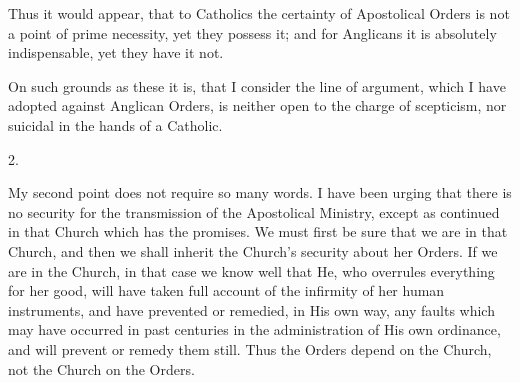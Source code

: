 Thus it would appear, that to Catholics the certainty of
Apostolical Orders is not a point of prime necessity, yet they possess
it; and for Anglicans it is absolutely indispensable, yet they have it
not.

On such grounds as these it is, that I consider the line of
argument, which I have adopted against Anglican Orders, is neither
open to the charge of scepticism, nor suicidal in the hands of a
Catholic.

2.

My second point does not require so many words. I have been urging
that there is no security for the transmission of the Apostolical
Ministry, except as continued in that Church which has the promises.
We must first be sure that we are in that Church, and then we
shall inherit the Church's security about her Orders. If we are in the
Church, in that case we know well that He, who overrules everything
for her good, will have taken full account of the infirmity of her
human instruments, and have prevented or remedied, in His own way, any
faults which may have occurred in past centuries in the administration
of His own ordinance, and will prevent or remedy them still. Thus the
Orders depend on the Church, not the Church on the Orders.

